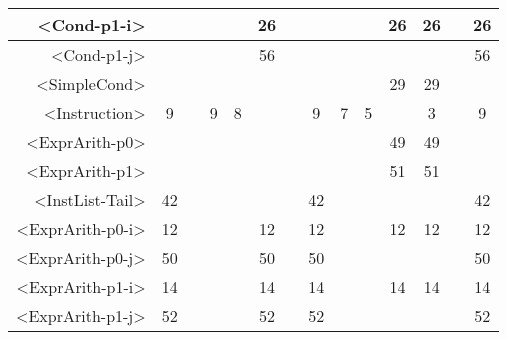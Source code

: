 \begin{tabular}{r|c@{ }c@{ }c@{ }c@{ }c@{ }c@{ }c@{ }c@{ }c@{ }c@{ }c@{ }c@{ }c@{ }}
<Cond-p1-i> &   &   &   &   & 26 &   &   &   &   & 26 & 26 &   & 26 \\\hline
<Cond-p1-j> &   &   &   &   & 56 &   &   &   &   &   &   &   & 56 \\\hline
<SimpleCond> &   &   &   &   &   &   &   &   &   & 29 & 29 &   &   \\\hline
<Instruction> & 9 &   & 9 & 8 &   &   & 9 & 7 & 5 &   & 3 &   & 9 \\\hline
<ExprArith-p0> &   &   &   &   &   &   &   &   &   & 49 & 49 &   &   \\\hline
<ExprArith-p1> &   &   &   &   &   &   &   &   &   & 51 & 51 &   &   \\\hline
<InstList-Tail> & 42 &   &   &   &   &   & 42 &   &   &   &   &   & 42 \\\hline
<ExprArith-p0-i> & 12 &   &   &   & 12 &   & 12 &   &   & 12 & 12 &   & 12 \\\hline
<ExprArith-p0-j> & 50 &   &   &   & 50 &   & 50 &   &   &   &   &   & 50 \\\hline
<ExprArith-p1-i> & 14 &   &   &   & 14 &   & 14 &   &   & 14 & 14 &   & 14 \\\hline
<ExprArith-p1-j> & 52 &   &   &   & 52 &   & 52 &   &   &   &   &   & 52 \\\hline
\end{tabular}



